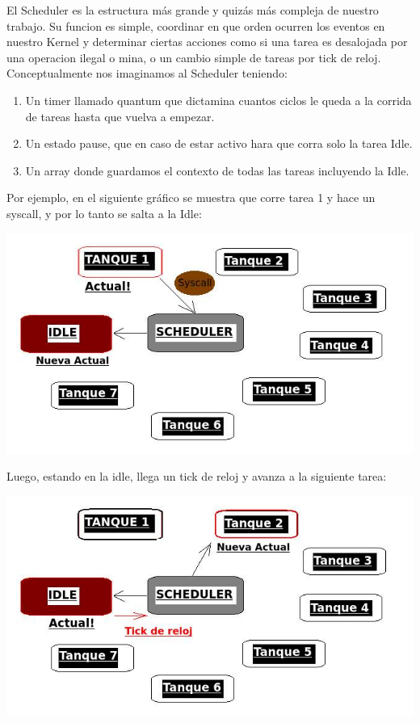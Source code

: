 El Scheduler es la estructura m\'as grande y quiz\'as m\'as compleja de nuestro trabajo. Su funcion es simple, coordinar en 
que orden ocurren los eventos en nuestro Kernel y determinar ciertas acciones como si una tarea es desalojada por una operacion ilegal o mina, o un cambio simple de tareas por tick de reloj.\\
Conceptualmente nos imaginamos al Scheduler teniendo:
\begin{enumerate}
 \item Un timer llamado quantum que dictamina cuantos ciclos le queda a la corrida de tareas hasta que vuelva a empezar.
 \item Un estado pause, que en caso de estar activo hara que corra solo la tarea Idle.
 \item Un array donde guardamos el contexto de todas las tareas incluyendo la Idle.
\end{enumerate}

Por ejemplo, en el siguiente gráfico se muestra que corre tarea 1 y hace un syscall, y por lo tanto se salta a la Idle:\\
\begin{center}
\includegraphics[scale=0.6]{imagenes/SchedulerSyscall.jpg} 
\end{center}

Luego, estando en la idle, llega un tick de reloj y avanza a la siguiente tarea:\\
\begin{center}
\includegraphics[scale=0.6]{imagenes/SchedulerTick.jpg} 
\end{center}


